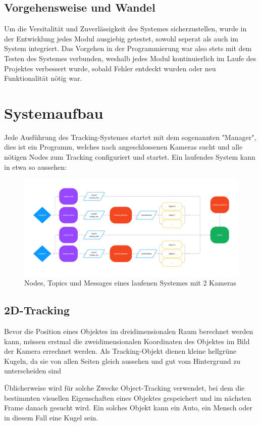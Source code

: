\documentclass[12pt]{article}
\begin{document}
\subsection{Vorgehensweise und Wandel}
Um die Versitalität und Zuverlässigkeit des Systemes sicherzustellen, wurde in der Entwicklung jedes Modul ausgiebig getestet, sowohl seperat als auch im System integriert. Das Vorgehen in der Programmierung war also stets mit dem Testen des Systemes verbunden, weshalb jedes Modul kontinuierlich im Laufe des Projektes verbessert wurde, sobald Fehler entdeckt wurden oder neu Funktionalität nötig war. 

\newpage
\section{Systemaufbau}
Jede Ausführung des Tracking-Systemes startet mit dem sogenannten "Manager", dies ist ein Programm, welches nach angeschlossenen Kameras sucht und alle nötigen Nodes zum Tracking configuriert und startet. Ein laufendes System kann in etwa so aussehen:
\begin{figure}[h]
  \centering
  \includegraphics[angle=0,width=\linewidth]{anytrack-basic-tracking.png}
  \caption{Nodes, Topics und Messages eines laufenen Systemes mit 2 Kameras}
\end{figure}

\subsection{2D-Tracking}
Bevor die Position eines Objektes im dreidimensionalen Raum berechnet werden kann, müssen erstmal die zweidimensionalen Koordinaten des Objektes im Bild der Kamera errechnet werden. Als Tracking-Objekt dienen kleine hellgrüne Kugeln, da sie von allen Seiten gleich aussehen und gut vom Hintergrund zu unterscheiden sind  

Üblicherweise wird für solche Zwecke Object-Tracking verwendet, bei dem die bestimmten visuellen Eigenschaften eines Objektes gespeichert und im nächsten Frame danach gesucht wird. Ein solches Objekt kann ein Auto, ein Mensch oder in diesem Fall eine Kugel sein.  
\end{document}
